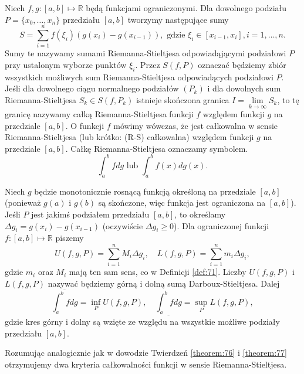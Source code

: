 \documentclass[leqno]{article}
\begin{document}
\begin{justify}
\begin{defn}
    Niech $f, g : [a,b] \mapsto \mathbb{R}$ będą funkcjami ograniczonymi. Dla dowolnego podziału 
    $P = \{x_0, \ldots, x_n\}$ przedziału $[a,b]$ tworzymy następujące sumy
    \[
        S = \sum_{i=1}^{n}f(\xi_i)(g(x_i)-g(x_{i-1})), \text{ gdzie } \xi_i \in [x_{i-1}, x_i], i = 1, \ldots, n.
    \]
    Sumy te nazywamy sumami Riemanna-Stieltjesa odpowiadąjącymi podziałowi $P$ przy ustalonym wyborze punktów $\xi_i$.
    Przez $S(f, P)$ oznaczać będziemy zbiór wszystkich możliwych sum Riemanna-Stieltjesa odpowiadących podziałowi $P$. \\
    Jeśli dla dowolnego ciągu normalnego podziałów $(P_k)$ i dla dowolnych sum Riemanna-Stieltjesa $S_k \in S(f, P_k)$ istnieje
    skończona granica $I = \lim\limits_{k \to \infty} S_k$, to tę granicę nazywamy całką Riemanna-Stieltjesa funkcji $f$ względem
    funkcji $g$ na przedziale $[a,b]$. O funkcji $f$ mówimy wówczas, że jest całkowalna w sensie Riemanna-Stieltjesa (lub krótko: (R-S) całkowalna) względem
    funkcji $g$ na przedziale $[a,b]$. Całkę Riemanna-Stieltjesa oznaczamy symbolem.
    \[
        \int_{a}^{b}fdg \text{ lub } \int_{a}^{b}f(x)dg(x).
    \]
\end{defn}

\begin{defn}
    Niech $g$ będzie monotonicznie rosnącą funkcją określoną na przedziale $[a,b]$ (ponieważ $g(a)$ i $g(b)$ są skończone, więc funkcja jest
    ograniczona na $[a,b]$). Jeśli $P$ jest jakimś podziałem przedziału $[a,b]$, to określamy $\Delta{g_i} = g(x_i) - g(x_{i-1})$ (oczywiście $\Delta{g_i} \geqslant 0$).
    Dla ograniczonej funkcji $f : [a,b] \mapsto \mathbb{R}$ piszemy
    \[
        U(f, g, P) = \sum_{i=1}^{n}M_i\Delta{g_i}, \quad L(f, g, P) = \sum_{i=1}^{n}m_i\Delta{g_i},
    \]
    gdzie $m_i$ oraz $M_i$ mają ten sam sens, co w Definicji \ref{def:71}. Liczby $U(f, g, P)$ i $L(f, g, P)$
    nazywać będziemy górną i dolną sumą Darboux-Stieltjesa. Dalej
    \[
        \overline{\int_{a}^{b}fdg} = \inf\limits_{P}U(f, g, P), \quad \underline{\int_{a}^{b}fdg} = \sup\limits_{P}L(f, g, P),
    \]
    gdzie kres górny i dolny są wzięte ze względu na wszystkie możliwe podziały przedziału $[a,b]$.
\end{defn}

Rozumując analogicznie jak w dowodzie Twierdzeń \ref{theorem:76} i \ref{theorem:77} otrzymujemy dwa kryteria całkowalności funkcji
w sensie Riemanna-Stieltjesa.


\end{justify}
\end{document}
